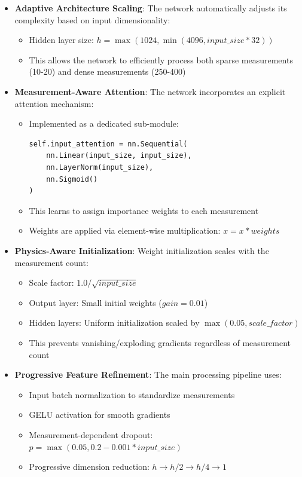 \documentclass{optica-article}
\begin{document}
\begin{itemize}
\item \textbf{Adaptive Architecture Scaling}: The network automatically adjusts its complexity based on input dimensionality:
\begin{itemize}
\item Hidden layer size: $h = \max(1024, \min(4096, input\_size * 32))$
\item This allows the network to efficiently process both sparse measurements (10-20) and dense measurements (250-400)
\end{itemize}

\item \textbf{Measurement-Aware Attention}: The network incorporates an explicit attention mechanism:
\begin{itemize}
\item Implemented as a dedicated sub-module:
\begin{verbatim}
self.input_attention = nn.Sequential(
    nn.Linear(input_size, input_size),
    nn.LayerNorm(input_size),
    nn.Sigmoid()
)
\end{verbatim}
\item This learns to assign importance weights to each measurement
\item Weights are applied via element-wise multiplication: $x = x * weights$
\end{itemize}

\item \textbf{Physics-Aware Initialization}: Weight initialization scales with the measurement count:
\begin{itemize}
\item Scale factor: $1.0/\sqrt{input\_size}$
\item Output layer: Small initial weights ($gain=0.01$)
\item Hidden layers: Uniform initialization scaled by $\max(0.05, scale\_factor)$
\item This prevents vanishing/exploding gradients regardless of measurement count
\end{itemize}

\item \textbf{Progressive Feature Refinement}: The main processing pipeline uses:
\begin{itemize}
\item Input batch normalization to standardize measurements
\item GELU activation for smooth gradients
\item Measurement-dependent dropout: $p = \max(0.05, 0.2 - 0.001 * input\_size)$
\item Progressive dimension reduction: $h \rightarrow h/2 \rightarrow h/4 \rightarrow 1$
\end{itemize}
\end{itemize}
\end{document}
